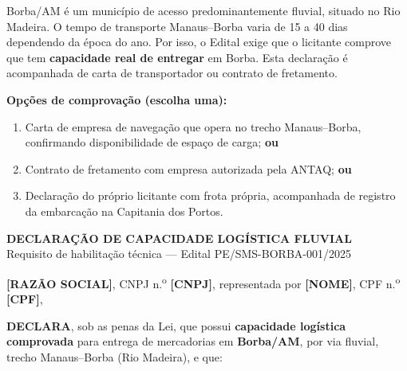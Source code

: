 \documentclass[12pt,a4paper]{article}
\newcommand{\editalRef}{PE/SMS-BORBA-001/2025}
\begin{document}
\begin{dicabox}
\small
Borba/AM é um município de acesso predominantemente fluvial, situado no Rio
Madeira. O tempo de transporte Manaus--Borba varia de 15 a 40 dias dependendo
da época do ano. Por isso, o Edital exige que o licitante comprove que tem
\textbf{capacidade real de entregar} em Borba. Esta declaração é acompanhada
de carta de transportador ou contrato de fretamento.

\medskip
\textbf{Opções de comprovação (escolha uma):}
\begin{enumerate}[leftmargin=*,topsep=2pt,itemsep=1pt]
  \item Carta de empresa de navegação que opera no trecho Manaus--Borba,
    confirmando disponibilidade de espaço de carga; \textbf{ou}
  \item Contrato de fretamento com empresa autorizada pela ANTAQ; \textbf{ou}
  \item Declaração do próprio licitante com frota própria, acompanhada de
    registro da embarcação na Capitania dos Portos.
\end{enumerate}
\end{dicabox}

\vspace{0.3cm}
\begin{fillbox}
\begin{center}
  {\bfseries\color{navy}DECLARAÇÃO DE CAPACIDADE LOGÍSTICA FLUVIAL}\\[4pt]
  {\small Requisito de habilitação técnica --- Edital \editalRef}
\end{center}
\end{fillbox}

\bigskip
\noindent\textbf{[RAZÃO SOCIAL]}, CNPJ n.\textsuperscript{o} \textbf{[CNPJ]},
representada por \textbf{[NOME]}, CPF n.\textsuperscript{o} \textbf{[CPF]},

\bigskip
\noindent\textbf{DECLARA}, sob as penas da Lei, que possui
\textbf{capacidade logística comprovada} para entrega de mercadorias em
\textbf{Borba/AM}, por via fluvial, trecho Manaus--Borba (Rio Madeira),
e que:
\end{document}
